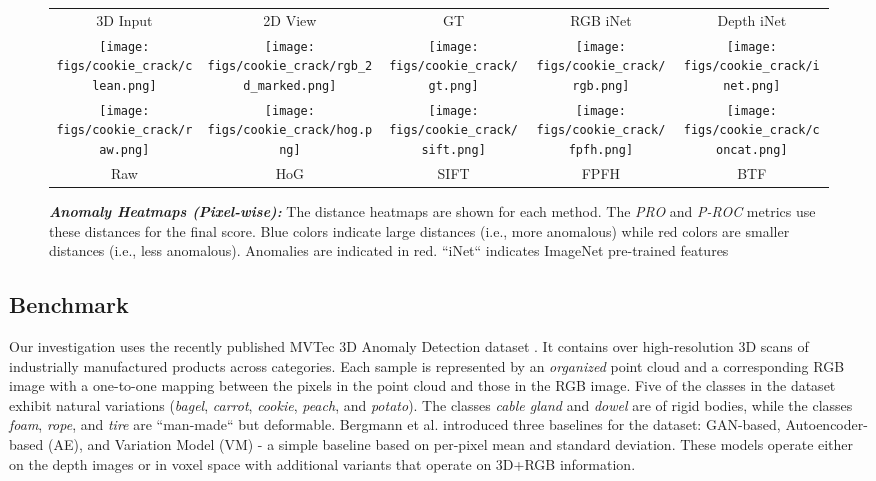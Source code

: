 \documentclass{article}
\begin{document}
\begin{figure*}[t]
\begin{tabular}{@{\hskip1pt}c@{\hskip1pt}c@{\hskip1pt}c@{\hskip1pt}c@{\hskip1pt}c}
3D Input & 2D View & GT & RGB iNet & Depth iNet\\
\texttt{[image: figs/cookie\_crack/clean.png]} & 
\texttt{[image: figs/cookie\_crack/rgb\_2d\_marked.png]} & 
\texttt{[image: figs/cookie\_crack/gt.png]} & 
\texttt{[image: figs/cookie\_crack/rgb.png]} & 
\texttt{[image: figs/cookie\_crack/inet.png]} \\
\texttt{[image: figs/cookie\_crack/raw.png]} & 
\texttt{[image: figs/cookie\_crack/hog.png]} & 
\texttt{[image: figs/cookie\_crack/sift.png]} & 
\texttt{[image: figs/cookie\_crack/fpfh.png]} & 
\texttt{[image: figs/cookie\_crack/concat.png]} \\
Raw & HoG & SIFT & FPFH & BTF \\
\end{tabular}
 \caption{\textit{\textbf{Anomaly Heatmaps (Pixel-wise):}} The distance heatmaps are shown for each method. The \textit{PRO} and \textit{P-ROC} metrics use these distances for the final score. Blue colors indicate large distances (i.e., more anomalous) while red colors are smaller distances (i.e., less anomalous). Anomalies are indicated in red. ``iNet`` indicates ImageNet pre-trained features}
\label{fig:heatmaps}
\end{figure*}

\subsection{Benchmark}
Our investigation uses the recently published MVTec 3D Anomaly Detection dataset \cite{mvtec3d}. It contains over  high-resolution 3D scans of industrially manufactured products across  categories. Each sample is represented by an \textit{organized} point cloud and a corresponding RGB image with a one-to-one mapping between the pixels in the point cloud and those in the RGB image. Five of the classes in the dataset exhibit natural variations (\emph{bagel}, \emph{carrot}, \emph{cookie}, \emph{peach}, and \emph{potato}). The classes \emph{cable gland} and \emph{dowel} are of rigid bodies, while the classes \emph{foam}, \emph{rope}, and \emph{tire} are ``man-made`` but deformable. Bergmann et al. \cite{mvtec3d} introduced three baselines for the dataset: GAN-based, Autoencoder-based (AE), and Variation Model (VM) - a simple baseline based on per-pixel mean and standard deviation. These models operate either on the depth images or in voxel space with additional variants that operate on 3D+RGB information.
\end{document}
